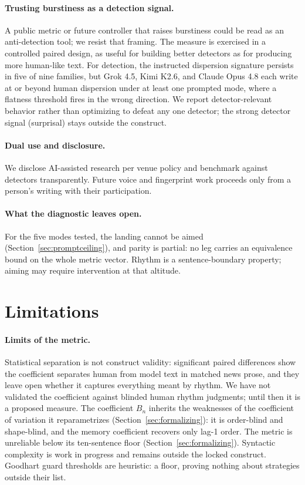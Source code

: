 \documentclass{article}
\begin{document}
\paragraph{Trusting burstiness as a detection signal.}
A public metric or future controller that raises burstiness could be read as an anti-detection tool; we resist that framing. The measure is exercised in a controlled paired design, as useful for building better detectors as for producing more human-like text. For detection, the instructed dispersion signature persists in five of nine families, but Grok 4.5, Kimi K2.6, and Claude Opus 4.8 each write at or beyond human dispersion under at least one prompted mode, where a flatness threshold fires in the wrong direction. We report detector-relevant behavior rather than optimizing to defeat any one detector; the strong detector signal (surprisal) stays outside the construct.

\paragraph{Dual use and disclosure.}
We disclose AI-assisted research per venue policy and benchmark against detectors transparently. Future voice and fingerprint work proceeds only from a person's writing with their participation.

\paragraph{What the diagnostic leaves open.}
For the five modes tested, the landing cannot be aimed (Section~\ref{sec:promptceiling}), and parity is partial: no leg carries an equivalence bound on the whole metric vector. Rhythm is a sentence-boundary property; aiming may require intervention at that altitude.

\section{Limitations}\label{sec:limitations}

\paragraph{Limits of the metric.}
Statistical separation is not construct validity: significant paired
differences show the coefficient separates human from model text in matched news prose, and
they leave open whether it captures everything meant by rhythm. We have not validated the
coefficient against blinded human rhythm judgments; until then it is a proposed measure.
The coefficient $B_n$ inherits the weaknesses of the coefficient of variation it reparametrizes
(Section~\ref{sec:formalizing}): it is order-blind and shape-blind, and the memory coefficient
recovers only lag-1 order. The metric is unreliable below its ten-sentence floor
(Section~\ref{sec:formalizing}).
Syntactic complexity is work in progress and remains outside the locked construct.
Goodhart guard thresholds are heuristic: a floor, proving nothing about strategies outside
their list.
\end{document}
